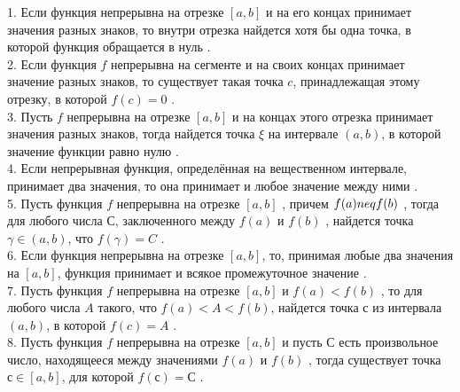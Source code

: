 \documentclass[12pt]{article}
\begin{document}
1. Если функция непрерывна на отрезке ${\displaystyle [a,b]}$ и на его концах принимает значения разных знаков, то внутри отрезка найдется хотя бы одна точка, в которой функция обращается в нуль .\\

2. Если функция ${\displaystyle f}$ непрерывна на сегменте и на своих концах принимает значение разных знаков, то существует такая точка ${\displaystyle c}$, принадлежащая этому отрезку, в которой ${\displaystyle f(c)=0}$ .\\

3. Пусть ${\displaystyle f}$ непрерывна на отрезке ${\displaystyle [a,b]}$ и на концах этого отрезка принимает значения разных знаков, тогда найдется точка ${\displaystyle \xi}$ на интервале ${\displaystyle (a,b)}$, в которой значение функции равно нулю .\\

4. Если непрерывная функция, определённая на вещественном интервале, принимает два значения, то она принимает и любое значение между ними .\\

5. Пусть функция ${\displaystyle f}$ непрерывна на отрезке ${\displaystyle [a,b]}$ , причем ${\displaystyle f(a) \\neq f(b)}$ , тогда для любого числа ${\displaystyle С}$, заключенного между ${\displaystyle f(a)}$ и ${\displaystyle f(b)}$ , найдется точка ${\displaystyle \gamma \in (a,b)}$, что ${\displaystyle f(\gamma)=C}$ .\\

6. Если функция непрерывна на отрезке ${\displaystyle [a,b]}$, то, принимая любые два значения на ${\displaystyle [a,b]}$, функция принимает и всякое промежуточное значение .\\

7. Пусть функция ${\displaystyle f}$ непрерывна на отрезке ${\displaystyle [a,b]}$ и ${\displaystyle f(a)<f(b)}$ , то для любого числа ${\displaystyle A}$ такого, что ${\displaystyle f(a)<A<f(b)}$, найдется точка ${\displaystyle с}$ из интервала ${\displaystyle (a,b)}$, в которой ${\displaystyle f(c)=A}$ .\\

8. Пусть функция ${\displaystyle f}$ непрерывна на отрезке ${\displaystyle [a,b]}$ и пусть ${\displaystyle С}$ есть произвольное число, находящееся между значениями ${\displaystyle f(a)}$ и ${\displaystyle f(b)}$ , тогда существует точка ${\displaystyle с \in [a,b]}$, для которой ${\displaystyle f(с)=С}$ .\\
\end{document}

